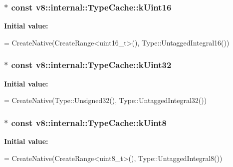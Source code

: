 \subsubsection[{\texorpdfstring{k\+Uint16}{kUint16}}]{$\ast$ const v8\+::internal\+::\+Type\+Cache\+::k\+Uint16}\hypertarget{classv8_1_1internal_1_1_type_cache_adaab7dc0c74e888386479c1ae5b02967}{}\label{classv8_1_1internal_1_1_type_cache_adaab7dc0c74e888386479c1ae5b02967}
{\bfseries Initial value\+:}
\begin{DoxyCode}
=
      CreateNative(CreateRange<uint16\_t>(), Type::UntaggedIntegral16())
\end{DoxyCode}
\subsubsection[{\texorpdfstring{k\+Uint32}{kUint32}}]{$\ast$ const v8\+::internal\+::\+Type\+Cache\+::k\+Uint32}\hypertarget{classv8_1_1internal_1_1_type_cache_aed54e775eb827928d3a2c52f25fda396}{}\label{classv8_1_1internal_1_1_type_cache_aed54e775eb827928d3a2c52f25fda396}
{\bfseries Initial value\+:}
\begin{DoxyCode}
=
      CreateNative(Type::Unsigned32(), Type::UntaggedIntegral32())
\end{DoxyCode}
\subsubsection[{\texorpdfstring{k\+Uint8}{kUint8}}]{$\ast$ const v8\+::internal\+::\+Type\+Cache\+::k\+Uint8}\hypertarget{classv8_1_1internal_1_1_type_cache_a4d41a481e6157c8e310e9de752e10a2e}{}\label{classv8_1_1internal_1_1_type_cache_a4d41a481e6157c8e310e9de752e10a2e}
{\bfseries Initial value\+:}
\begin{DoxyCode}
=
      CreateNative(CreateRange<uint8\_t>(), Type::UntaggedIntegral8())
\end{DoxyCode}
